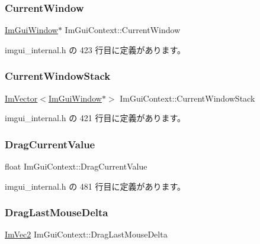 \subsubsection{\texorpdfstring{Current\+Window}{CurrentWindow}}
{\footnotesize\ttfamily \mbox{\hyperlink{struct_im_gui_window}{Im\+Gui\+Window}}$\ast$ Im\+Gui\+Context\+::\+Current\+Window}



 imgui\+\_\+internal.\+h の 423 行目に定義があります。

\mbox{\label{struct_im_gui_context_a19020a20e7bca2fadbb287106b92891b}} 
\subsubsection{\texorpdfstring{Current\+Window\+Stack}{CurrentWindowStack}}
{\footnotesize\ttfamily \mbox{\hyperlink{class_im_vector}{Im\+Vector}}$<$\mbox{\hyperlink{struct_im_gui_window}{Im\+Gui\+Window}}$\ast$$>$ Im\+Gui\+Context\+::\+Current\+Window\+Stack}



 imgui\+\_\+internal.\+h の 421 行目に定義があります。

\mbox{\label{struct_im_gui_context_a96ed5993aaddb183dc36244912ea261f}} 
\subsubsection{\texorpdfstring{Drag\+Current\+Value}{DragCurrentValue}}
{\footnotesize\ttfamily float Im\+Gui\+Context\+::\+Drag\+Current\+Value}



 imgui\+\_\+internal.\+h の 481 行目に定義があります。

\mbox{\label{struct_im_gui_context_a804ee75ff62a35d2955ecf7917e704f9}} 
\subsubsection{\texorpdfstring{Drag\+Last\+Mouse\+Delta}{DragLastMouseDelta}}
{\footnotesize\ttfamily \mbox{\hyperlink{struct_im_vec2}{Im\+Vec2}} Im\+Gui\+Context\+::\+Drag\+Last\+Mouse\+Delta}



